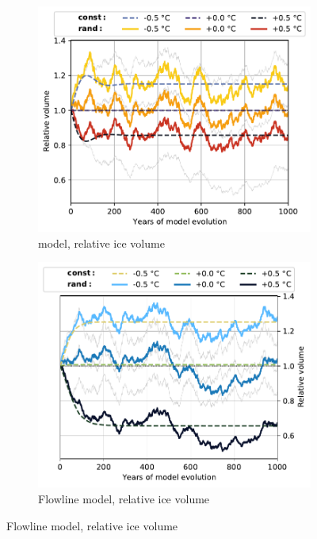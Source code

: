 \begin{figure}[p]
  \centering

  \begin{subfigure}[b]{0.476\textwidth}
    \caption{\Vas{} model, relative ice volume}
    \label{fig:Rhonegletscher:volume_vas}
    \centering
    \includegraphics[width=\textwidth]{../plots/final_plots/time_series/single_glaciers/volume_norm_vas_Rhonegletscher.pdf}
  \end{subfigure}
  \hfill
  \begin{subfigure}[b]{0.476\textwidth}
    \caption{Flowline model, relative ice volume}
    \label{fig:Rhonegletscher:volume_fl}
    \centering
    \includegraphics[width=\textwidth]{../plots/final_plots/time_series/single_glaciers/volume_norm_fl_Rhonegletscher.pdf}
  \end{subfigure}


\end{figure}
